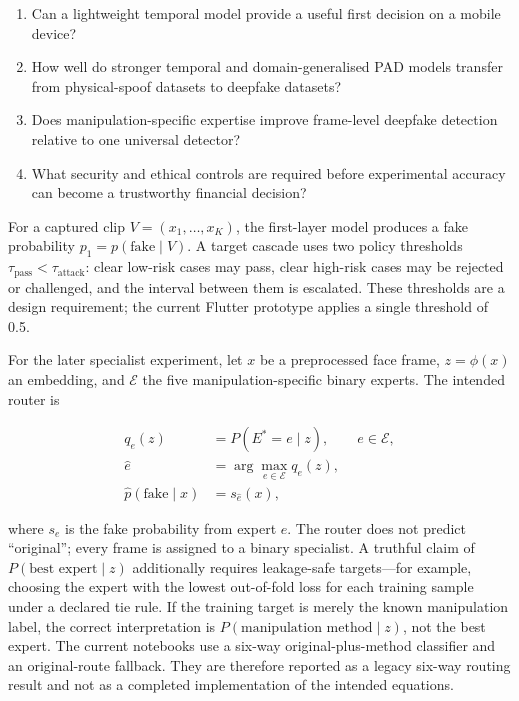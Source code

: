 \begin{enumerate}
  \item Can a lightweight temporal model provide a useful first decision on a
        mobile device?
  \item How well do stronger temporal and domain-generalised PAD models transfer
        from physical-spoof datasets to deepfake datasets?
  \item Does manipulation-specific expertise improve frame-level deepfake
        detection relative to one universal detector?
  \item What security and ethical controls are required before experimental
        accuracy can become a trustworthy financial decision?
\end{enumerate}

For a captured clip $V=(x_1,\ldots,x_K)$, the first-layer model produces a fake
probability $p_1=p(\mathrm{fake}\mid V)$. A target cascade uses two policy
thresholds $\tau_{\mathrm{pass}}<\tau_{\mathrm{attack}}$: clear low-risk cases
may pass, clear high-risk cases may be rejected or challenged, and the interval
between them is escalated. These thresholds are a design requirement; the current
Flutter prototype applies a single threshold of 0.5.

For the later specialist experiment, let $x$ be a preprocessed face frame,
$z=\phi(x)$ an embedding, and $\mathcal{E}$ the five manipulation-specific binary
experts. The intended router is

\begin{align}
q_e(z) &= P(E^*=e\mid z), \qquad e\in\mathcal{E},\\
\hat e &= \arg\max_{e\in\mathcal{E}} q_e(z),\\
\widehat p(\mathrm{fake}\mid x) &= s_{\hat e}(x),
\end{align}

where $s_e$ is the fake probability from expert $e$. The router does not predict
``original''; every frame is assigned to a binary specialist. A truthful claim of
$P(\text{best expert}\mid z)$ additionally requires leakage-safe targets---for
example, choosing the expert with the lowest out-of-fold loss for each training
sample under a declared tie rule. If the training target is merely the known
manipulation label, the correct interpretation is
$P(\text{manipulation method}\mid z)$, not the best expert. The current notebooks
use a six-way original-plus-method classifier and an original-route fallback.
They are therefore reported as a legacy six-way routing result and not as a
completed implementation of the intended equations.

